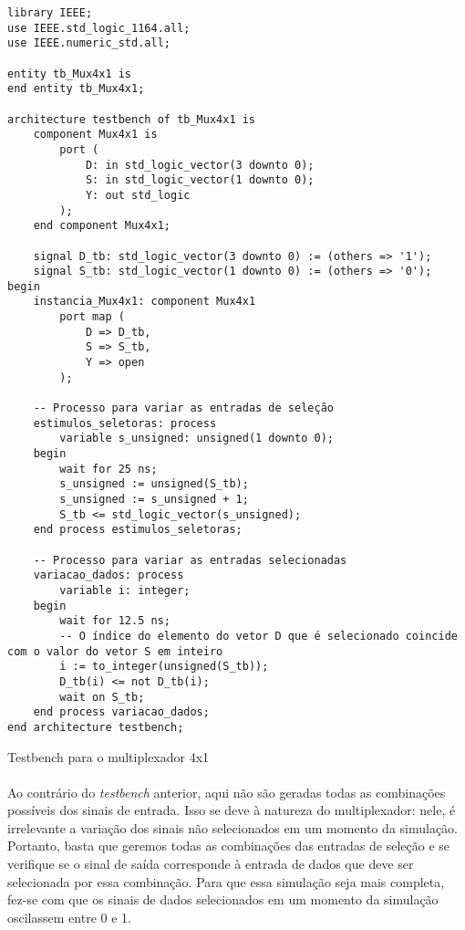 \documentclass[a4paper,12pt]{article}
\newenvironment{code}{\captionsetup{type=listing}}{}
\begin{document}
\begin{code}
\begin{verbatim}
library IEEE;
use IEEE.std_logic_1164.all;
use IEEE.numeric_std.all;

entity tb_Mux4x1 is
end entity tb_Mux4x1;

architecture testbench of tb_Mux4x1 is
    component Mux4x1 is
        port (
            D: in std_logic_vector(3 downto 0);
            S: in std_logic_vector(1 downto 0);
            Y: out std_logic
        );
    end component Mux4x1;
    
    signal D_tb: std_logic_vector(3 downto 0) := (others => '1');
    signal S_tb: std_logic_vector(1 downto 0) := (others => '0');
begin
    instancia_Mux4x1: component Mux4x1
        port map (
            D => D_tb,
            S => S_tb,
            Y => open
        );

    -- Processo para variar as entradas de seleção
    estimulos_seletoras: process
        variable s_unsigned: unsigned(1 downto 0);
    begin
        wait for 25 ns;
        s_unsigned := unsigned(S_tb);
        s_unsigned := s_unsigned + 1;
        S_tb <= std_logic_vector(s_unsigned);
    end process estimulos_seletoras;
    
    -- Processo para variar as entradas selecionadas
    variacao_dados: process
        variable i: integer;
    begin
        wait for 12.5 ns;
        -- O índice do elemento do vetor D que é selecionado coincide com o valor do vetor S em inteiro
        i := to_integer(unsigned(S_tb));
        D_tb(i) <= not D_tb(i);
        wait on S_tb;
    end process variacao_dados;
end architecture testbench;
\end{verbatim}
\caption{Testbench para o multiplexador 4x1}
\end{code}

\paragraph{}
Ao contrário do \textit{testbench} anterior, aqui não são geradas todas as combinações possíveis dos sinais de entrada. Isso se deve à natureza do multiplexador: nele, é irrelevante a variação dos sinais não selecionados em um momento da simulação. Portanto, basta que geremos todas as combinações das entradas de seleção e se verifique se o sinal de saída corresponde à entrada de dados que deve ser selecionada por essa combinação. Para que essa simulação seja mais completa, fez-se com que os sinais de dados selecionados em um momento da simulação oscilassem entre 0 e 1.
\end{document}

